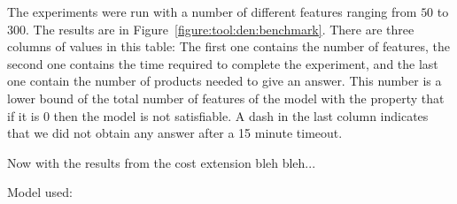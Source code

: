 The experiments were run with a number of different features ranging from $50$ to $300$.
The results are in Figure~\ref{figure:tool:den:benchmark}.
There are three columns of values in this table: The first one
contains the
number of features,
the second one contains the time required to complete the experiment, and 
the last one contain the number of products needed to give an answer. 
This number is a lower bound of the total number of features of the model
with the property that if it is 0 then the model is not satisfiable. A dash
in the last column indicates that we did not obtain any answer after a 15
minute timeout. 





Now with the results from the cost extension bleh bleh...

Model used:




